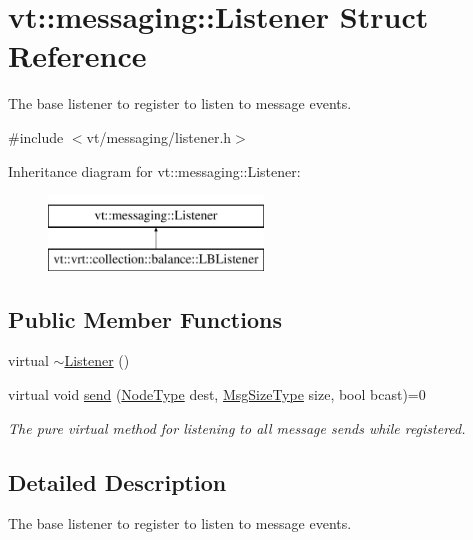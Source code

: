 \hypertarget{structvt_1_1messaging_1_1_listener}{}\section{vt\+:\+:messaging\+:\+:Listener Struct Reference}
\label{structvt_1_1messaging_1_1_listener}


The base listener to register to listen to message events.  




{\ttfamily \#include $<$vt/messaging/listener.\+h$>$}

Inheritance diagram for vt\+:\+:messaging\+:\+:Listener\+:\begin{figure}[H]
\begin{center}
\leavevmode
\includegraphics[height=2.000000cm]{structvt_1_1messaging_1_1_listener}
\end{center}
\end{figure}
\subsection*{Public Member Functions}
\begin{DoxyCompactItemize}
\item 
virtual \hyperlink{structvt_1_1messaging_1_1_listener_aee8a1131c7427cb1f8e2005605f2718c}{$\sim$\+Listener} ()
\item 
virtual void \hyperlink{structvt_1_1messaging_1_1_listener_ab2b334277feecb181a28f613c68bfc53}{send} (\hyperlink{namespacevt_a866da9d0efc19c0a1ce79e9e492f47e2}{Node\+Type} dest, \hyperlink{namespacevt_a408e86a8c7c89309b52907dc5a513924}{Msg\+Size\+Type} size, bool bcast)=0
\begin{DoxyCompactList}\small\item\em The pure virtual method for listening to all message sends while registered. \end{DoxyCompactList}\end{DoxyCompactItemize}


\subsection{Detailed Description}
The base listener to register to listen to message events. 

